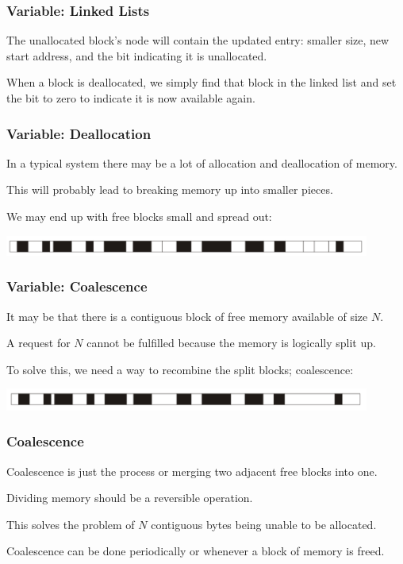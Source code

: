 \begin{frame}
\frametitle{Variable: Linked Lists}

The unallocated block's node will contain the updated entry: smaller size, new start address, and the bit indicating it is unallocated. 

When a block is deallocated, we simply find that block in the linked list and set the bit to zero to indicate it is now available again.

\end{frame}

\begin{frame}
\frametitle{Variable: Deallocation}

In a typical system there may be a lot of allocation and deallocation of memory. 

This will probably lead to breaking memory up into smaller pieces.

We may end up with free blocks small and spread out:
\begin{center}
\includegraphics[width=0.9\textwidth]{images/checkerboard.png}
\end{center}



\end{frame}

\begin{frame}
\frametitle{Variable: Coalescence}

It may be that there is a contiguous block of free memory available of size $N$. 

A request for $N$ cannot be fulfilled because the memory is logically split up. 

To solve this, we need a way to recombine the split blocks; \alert{coalescence}:

\begin{center}
\includegraphics[width=0.9\textwidth]{images/checkerboard-coalesced.png}
\end{center}


\end{frame}

\begin{frame}
\frametitle{Coalescence}

Coalescence is just the process or merging two adjacent free blocks into one. 

Dividing memory should be a reversible operation. 

This solves the problem of $N$ contiguous bytes being unable to be allocated. 

Coalescence can be done periodically or whenever a block of memory is freed.


\end{frame}

